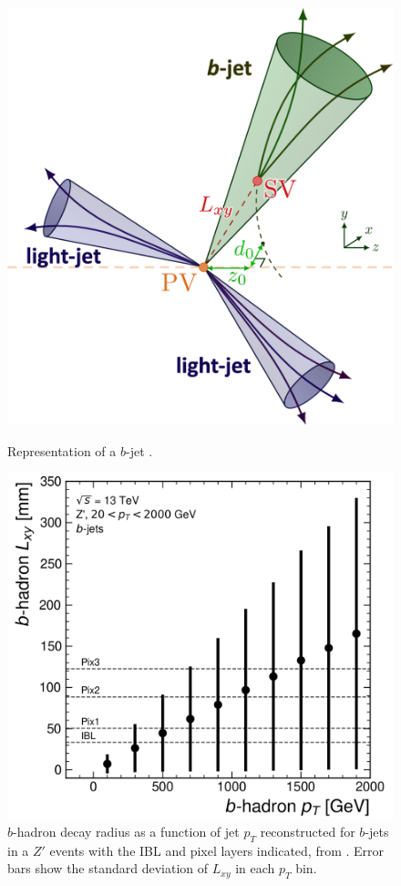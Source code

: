 
\begin{figure}[h!]
\center
\begin{minipage}{0.5\textwidth}
  \centering
  \includegraphics[width=\textwidth]{Images/FTAG/intro/jetIm.png} %
  \caption{Representation of a $b$-jet \cite{bjetimage}.}
  \label{fig:bjet}
\end{minipage}
\begin{minipage}{0.5\textwidth}
  \centering
  \includegraphics[width=\textwidth]{Images/FTAG/intro/bhaddecay.png}
  \caption{$b$-hadron decay radius as a function of jet $p_T$ reconstructed for $b$-jets in a $Z'$ events with the IBL and pixel layers indicated, from \cite{VanStroud:2869719}. Error bars show the standard deviation of $L_{xy}$ in each $p_T$ bin.} 
  \label{fig:bhaddecay}
\end{minipage}
\end{figure}

